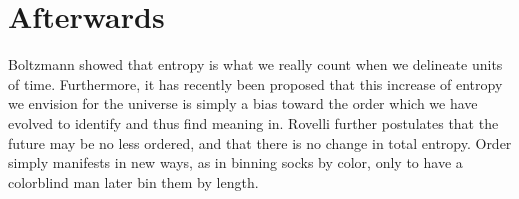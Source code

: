
% 
\graphicspath{{6/figures/}} %



\chapter{\label{}Afterwards}


Boltzmann showed that entropy is what we really count when we delineate units of time. Furthermore, it has recently been proposed \citep{connes1994neumann} that this increase of entropy we envision for the universe is simply a bias toward the order which we have evolved to identify and thus find meaning in. Rovelli further postulates that the future may be no less ordered, and that there is no change in total entropy. Order simply manifests in new ways, as in binning socks by color, only to have a colorblind man later bin them by length.

